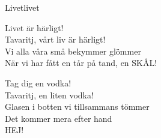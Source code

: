 \begin{song}{Livet}{livet}
\begin{vers}
\repopen Livet är härligt!\\
Tavaritj, vårt liv är härligt!\\
Vi alla våra små bekymmer glömmer\\
När vi har fått en tår på tand, en SKÅL!\\
\end{vers}
\begin{vers}
Tag dig en vodka!\\
Tavaritj, en liten vodka!\\
Glasen i botten vi tillsammans tömmer\\
Det kommer mera efter hand \repclose\\
HEJ!\\
\end{vers}
\end{song}
